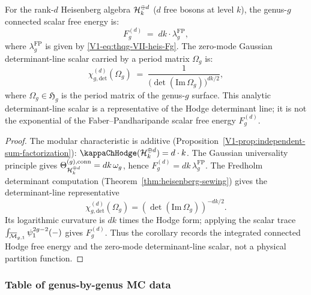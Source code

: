 \begin{corollary}
For the rank-$d$ Heisenberg algebra $\mathcal{H}_k^{\oplus d}$
\textup{(}$d$ free bosons at level $k$\textup{)}, the genus-$g$
connected scalar free energy is:
\begin{equation}%
F_g^{(d)}
\;=\;
d k\cdot\lambda_g^{\mathrm{FP}},
\end{equation}
where $\lambda_g^{\mathrm{FP}}$ is given by
\eqref{V1-eq:thqg-VII-heis-Fg}.
The zero-mode Gaussian determinant-line scalar carried by a
period matrix $\Omega_g$ is:
\begin{equation}%
\chi_{g,\mathrm{det}}^{(d)}(\Omega_g)
\;=\;
\frac{1}{\bigl(\det(\mathrm{Im}\,\Omega_g)\bigr)^{dk/2}},
\end{equation}
where $\Omega_g \in \mathfrak{H}_g$ is the period matrix of
the genus-$g$ surface. This analytic determinant-line scalar is a
representative of the Hodge determinant line; it is not the
exponential of the Faber--Pandharipande scalar free energy
$F_g^{(d)}$.
\end{corollary}

\begin{proof}
The modular characteristic is additive
(Proposition~\ref{V1-prop:independent-sum-factorization}):
$\kappaChHodge(\cH_k^{\oplus d}) = d \cdot k$. The Gaussian
universality principle gives
$\Theta^{(g),\mathrm{conn}}_{\mathcal{H}_k^{\oplus d}}=dk\,\omega_g$,
hence $F_g^{(d)}=dk\,\lambda_g^{\mathrm{FP}}$.
The Fredholm determinant computation
(Theorem~\ref{thm:heisenberg-sewing}) gives the determinant-line
representative
\[
\chi_{g,\mathrm{det}}^{(d)}(\Omega_g)
=(\det(\mathrm{Im}\,\Omega_g))^{-dk/2}.
\]
Its logarithmic curvature is $dk$ times the Hodge form; applying
the scalar trace
$\int_{\overline{\mathcal{M}}_{g,1}}\psi_1^{2g-2}(-)$ gives
$F_g^{(d)}$. Thus the corollary records the integrated connected
Hodge free energy and the zero-mode determinant-line scalar, not a
physical partition function.
\end{proof}

\subsubsection{Table of genus-by-genus MC data}

